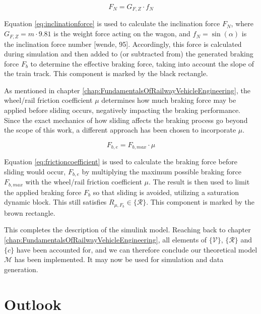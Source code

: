 \begin{equation}
\label{eq:inclinationforce}
F_{N} = G_{F,Z} \cdot f_{N}
\end{equation}

\noindent
Equation \ref{eq:inclinationforce} is used to calculate the inclination force $F_{N}$, where $G_{F,Z} = m \cdot 9.81$ is the weight force acting on the wagon, and $f_{N} = \sin(\alpha)$ is the inclination force number [wende, 95]. Accordingly, this force is calculated during simulation and then added to (or subtracted from) the generated braking force $F_{b}$ to determine the effective braking force, taking into account the slope of the train track. This component is marked by the black rectangle.
\par
As mentioned in chapter \ref{chap:FundamentalsOfRailwayVehicleEngineering}, the wheel/rail friction coefficient $\mu$ determines how much braking force may be applied before sliding occurs, negatively impacting the braking performance. Since the exact mechanics of how sliding affects the braking process go beyond the scope of this work, a different approach has been chosen to incorporate $\mu$.

\begin{equation}
\label{eq:frictioncoefficient}
F_{b,e} = F_{b,max} \cdot \mu
\end{equation}

\noindent
Equation \ref{eq:frictioncoefficient} is used to calculate the braking force before sliding would occur, $F_{b,e}$ by multiplying the maximum possible braking force $F_{b,max}$ with the wheel/rail friction coefficient $\mu$. The result is then used to limit the applied braking force $F_{b}$ so that sliding is avoided, utilizing a saturation dynamic block. This still satisfies $R_{\mu,F_{b}} \in \{ {\mathcal{R}} \}$. This component is marked by the brown rectangle.
\bigskip
\par\noindent
This completes the description of the simulink model. Reaching back to chapter \ref{chap:FundamentalsOfRailwayVehicleEngineering}, all elements of $\{ {\mathcal{V}} \}$, $\{ {\mathcal{R}} \}$ and $\{ c \}$ have been accounted for, and we can therefore conclude our theoretical model ${\mathcal{M}}$ has been implemented. It may now be used for simulation and data generation.

\section{Outlook}
\label{sec:Outlook}

